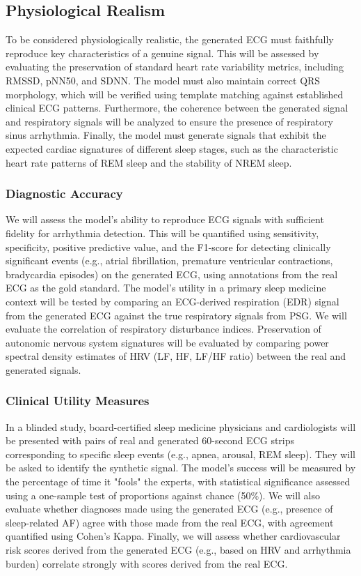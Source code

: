 \documentclass[11pt,en]{elegantpaper}
\begin{document}
\subsection{Physiological Realism}
To be considered physiologically realistic, the generated ECG must faithfully reproduce key characteristics of a genuine signal. This will be assessed by evaluating the preservation of standard heart rate variability metrics, including RMSSD, pNN50, and SDNN. The model must also maintain correct QRS morphology, which will be verified using template matching against established clinical ECG patterns. Furthermore, the coherence between the generated signal and respiratory signals will be analyzed to ensure the presence of respiratory sinus arrhythmia. Finally, the model must generate signals that exhibit the expected cardiac signatures of different sleep stages, such as the characteristic heart rate patterns of REM sleep and the stability of NREM sleep.

\subsubsection{Diagnostic Accuracy}
We will assess the model's ability to reproduce ECG signals with sufficient fidelity for arrhythmia detection. This will be quantified using sensitivity, specificity, positive predictive value, and the F1-score for detecting clinically significant events (e.g., atrial fibrillation, premature ventricular contractions, bradycardia episodes) on the generated ECG, using annotations from the real ECG as the gold standard. The model's utility in a primary sleep medicine context will be tested by comparing an ECG-derived respiration (EDR) signal from the generated ECG against the true respiratory signals from PSG. We will evaluate the correlation of respiratory disturbance indices. Preservation of autonomic nervous system signatures will be evaluated by comparing power spectral density estimates of HRV (LF, HF, LF/HF ratio) between the real and generated signals.

\subsubsection{Clinical Utility Measures}
In a blinded study, board-certified sleep medicine physicians and cardiologists will be presented with pairs of real and generated 60-second ECG strips corresponding to specific sleep events (e.g., apnea, arousal, REM sleep). They will be asked to identify the synthetic signal. The model's success will be measured by the percentage of time it "fools" the experts, with statistical significance assessed using a one-sample test of proportions against chance (50\%). We will also evaluate whether diagnoses made using the generated ECG (e.g., presence of sleep-related AF) agree with those made from the real ECG, with agreement quantified using Cohen's Kappa. Finally, we will assess whether cardiovascular risk scores derived from the generated ECG (e.g., based on HRV and arrhythmia burden) correlate strongly with scores derived from the real ECG.
\end{document}

